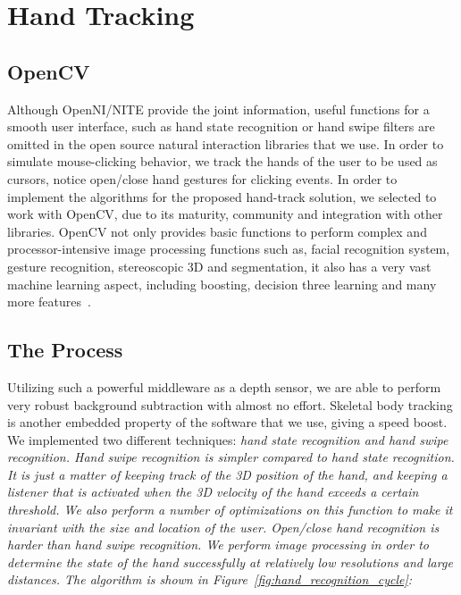 \chapter{Hand Tracking}
\label{appendix_hand_tracking}

\section{OpenCV}
 
Although OpenNI/NITE provide the joint information, useful functions for a smooth user interface, such as hand state recognition or hand swipe filters are omitted in the open source natural interaction libraries that we use. In order to simulate mouse-clicking behavior, we track the hands of the user to be used as cursors, notice open/close hand gestures for clicking events. In order to implement the algorithms for the proposed hand-track solution, we selected to work with OpenCV, due to its maturity, community and integration with other libraries. OpenCV not only provides basic functions to perform complex and processor-intensive image processing functions such as, facial recognition system, gesture recognition, stereoscopic 3D and segmentation, it also has a very vast machine learning aspect, including boosting, decision three learning and many more features~\cite{opencv_library}.

\section{The Process}

Utilizing such a powerful middleware as a depth sensor, we are able to perform very robust background subtraction with almost no effort. Skeletal body tracking is another embedded property of the software that we use, giving a speed boost. We implemented two different techniques: \em{hand state recognition} and \em{hand swipe recognition}. Hand swipe recognition is simpler compared to hand state recognition. It is just a matter of keeping track of the 3D position of the hand, and keeping a listener that is activated when the 3D velocity of the hand exceeds a certain threshold. We also perform a number of optimizations on this function to make it invariant with the size and location of the user. Open/close hand recognition is harder than hand swipe recognition. We perform image processing in order to determine the state of the hand successfully at relatively low resolutions and large distances. The algorithm is shown in Figure~\ref{fig:hand_recognition_cycle}:

